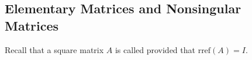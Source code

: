 \documentclass{ximera}
\begin{document}

 
 
\subsection*{Elementary Matrices and Nonsingular Matrices} 

Recall that a square matrix $A$ is called  provided that $\mbox{rref}(A)=I$.
\end{document}
